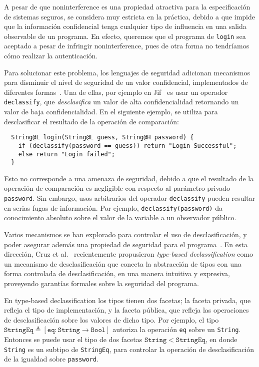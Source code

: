 A pesar de que noninterference es una propiedad atractiva para la especificación de sistemas seguros, se considera muy estricta en la práctica, debido a que impide que la información confidencial tenga cualquier tipo de influencia en una salida observable de un programa. En efecto, queremos que el programa de \texttt{login} sea aceptado a pesar de infringir noninterference, pues de otra forma no tendríamos cómo realizar la autenticación.

Para solucionar este problema, los lenguajes de seguridad adicionan mecanismos para disminuir el nivel de seguridad de un valor confidencial, implementados de diferentes formas~\cite{sabelfeldSands:JCS09}. Una de ellas, por ejemplo en Jif~\cite{jif} es usar un operador \texttt{declassify}, que \emph{desclasifica} un valor de alta confidencialidad retornando un valor de baja confidencialidad. En el siguiente ejemplo, se utiliza para desclasificar el resultado de la operación de comparación:

\begin{lstlisting}
  String@L login(String@L guess, String@H password) {
    if (declassify(password == guess)) return "Login Successful";
    else return "Login failed";
  }
\end{lstlisting}

Esto no corresponde a una amenaza de seguridad, debido a que el resultado de la operación de comparación es negligible con respecto al parámetro privado \texttt{password}. Sin embargo, usos arbitrarios del operador \texttt{declassify} pueden resultar en serias fugas de información. Por ejemplo, \texttt{declassify(password)} da conocimiento absoluto sobre el valor de la variable a un observador público.

Varios mecanismos se han explorado para controlar el uso de desclasificación, y poder asegurar además una propiedad de seguridad para el programa~\cite{sabelfeldSands:JCS09}. En esta dirección, Cruz et al.~\cite{cruzAl:ecoop2017} recientemente propusieron \emph{type-based declassification} como un mecanismo de desclasificación que conecta la abstracción de tipos con una forma controlada de desclasificación, en una manera intuitiva y expresiva, proveyendo garantías formales sobre la seguridad del programa.

En type-based declassification los tipos tienen dos facetas; la faceta privada, que refleja el tipo de implementación, y la faceta pública, que refleja las operaciones de desclasificación sobre los valores de dicho tipo. Por ejemplo, el tipo $\mathtt{StringEq} \triangleq [\mathtt{eq} : \mathtt{String} \rightarrow \mathtt{Bool}]$ autoriza la operación \texttt{eq} sobre un \texttt{String}. Entonces se puede usar el tipo de dos facetas $\mathtt{String} < \mathtt{StringEq}$, en donde \texttt{String} es un subtipo de \texttt{StringEq}, para controlar la operación de desclasificación de la igualdad sobre \texttt{password}.

